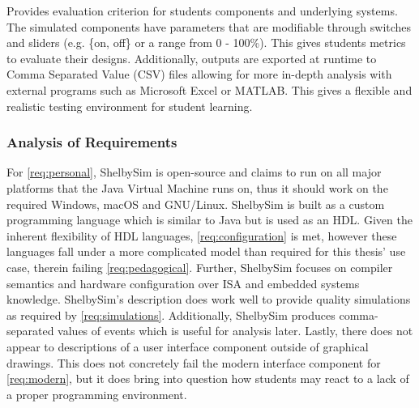 Provides evaluation criterion for students components and underlying systems. The simulated components have parameters that are modifiable through switches and sliders (e.g. \{on, off\} or a range from 0 - 100\%). This gives students metrics to evaluate their designs. Additionally, outputs are exported at runtime to Comma Separated Value (CSV) files allowing for more in-depth analysis with external programs such as Microsoft Excel or MATLAB. This gives a flexible and realistic testing environment for student learning. 

\subsubsection*{Analysis of Requirements}

For \cref{req:personal}, ShelbySim is open-source and claims to run on all major platforms that the Java Virtual Machine runs on, thus it should work on the required Windows, macOS and GNU/Linux\cite{Oracle2017}. ShelbySim is built as a custom programming language which is similar to Java but is used as an HDL. Given the inherent flexibility of HDL languages, \cref{req:configuration} is met, however these languages fall under a more complicated model than required for this thesis' use case, therein failing \cref{req:pedagogical}. Further, ShelbySim focuses on compiler semantics and hardware configuration over ISA and embedded systems knowledge.  ShelbySim's description does work well to provide quality simulations as required by \cref{req:simulations}. Additionally, ShelbySim produces comma-separated values of events which is useful for analysis later. Lastly, there does not appear to descriptions of a user interface component outside of graphical drawings. This does not concretely fail the modern interface component for \cref{req:modern}, but it does bring into question how students may react to a lack of a proper programming environment.

%


